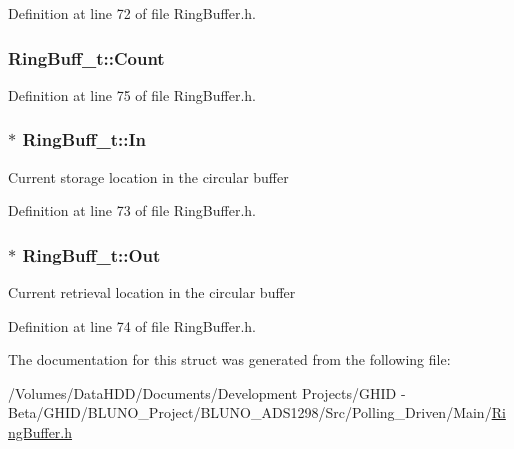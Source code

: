 \-Definition at line 72 of file \-Ring\-Buffer.\-h.

\hypertarget{struct_ring_buff__t_a41a9ebbce17afd63c9b1052b9374ab7f}{
\subsubsection[{\-Count}]{ {\bf \-Ring\-Buff\-\_\-t\-::\-Count}}}\label{struct_ring_buff__t_a41a9ebbce17afd63c9b1052b9374ab7f}


\-Definition at line 75 of file \-Ring\-Buffer.\-h.

\hypertarget{struct_ring_buff__t_ace48fed7a87967d5de48671dcd356ac6}{
\subsubsection[{\-In}]{$\ast$ {\bf \-Ring\-Buff\-\_\-t\-::\-In}}}\label{struct_ring_buff__t_ace48fed7a87967d5de48671dcd356ac6}
\-Current storage location in the circular buffer 

\-Definition at line 73 of file \-Ring\-Buffer.\-h.

\hypertarget{struct_ring_buff__t_adff6acf088e2c9697b9f19fb9ff91739}{
\subsubsection[{\-Out}]{$\ast$ {\bf \-Ring\-Buff\-\_\-t\-::\-Out}}}\label{struct_ring_buff__t_adff6acf088e2c9697b9f19fb9ff91739}
\-Current retrieval location in the circular buffer 

\-Definition at line 74 of file \-Ring\-Buffer.\-h.



\-The documentation for this struct was generated from the following file\-:\begin{DoxyCompactItemize}
\item 
/\-Volumes/\-Data\-H\-D\-D/\-Documents/\-Development Projects/\-G\-H\-I\-D -\/ Beta/\-G\-H\-I\-D/\-B\-L\-U\-N\-O\-\_\-\-Project/\-B\-L\-U\-N\-O\-\_\-\-A\-D\-S1298/\-Src/\-Polling\-\_\-\-Driven/\-Main/\hyperlink{_ring_buffer_8h}{\-Ring\-Buffer.\-h}\end{DoxyCompactItemize}
